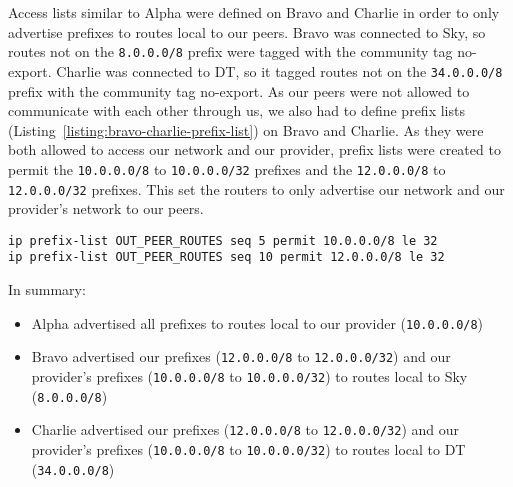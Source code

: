 Access lists similar to Alpha were defined on Bravo and Charlie in order to
only advertise prefixes to routes local to our peers. Bravo was connected to
Sky, so routes not on the \texttt{8.0.0.0/8} prefix were tagged with the
community tag no-export. Charlie was connected to DT, so it tagged routes not
on the \texttt{34.0.0.0/8} prefix with the community tag no-export. As our
peers were not allowed to communicate with each other through us, we also had
to define prefix lists (Listing~\ref{listing:bravo-charlie-prefix-list}) on Bravo and Charlie. As they were both allowed to
access our network and our provider, prefix lists were created to permit the
\texttt{10.0.0.0/8} to \texttt{10.0.0.0/32} prefixes and the
\texttt{12.0.0.0/8} to \texttt{12.0.0.0/32} prefixes. This set the routers to
only advertise our network and our provider's network to our peers.

\begin{lstlisting}[caption={Bravo and Charlie Prefix List}, label={listing:bravo-charlie-prefix-list}]
ip prefix-list OUT_PEER_ROUTES seq 5 permit 10.0.0.0/8 le 32
ip prefix-list OUT_PEER_ROUTES seq 10 permit 12.0.0.0/8 le 32
\end{lstlisting}

In summary:

\begin{itemize}
    \item Alpha advertised all prefixes to routes local to our provider
    (\texttt{10.0.0.0/8})

    \item Bravo advertised our prefixes (\texttt{12.0.0.0/8} to \texttt
    {12.0.0.0/32}) and our provider's prefixes (\texttt{10.0.0.0/8} to
    \texttt{10.0.0.0/32}) to routes local to Sky (\texttt{8.0.0.0/8})

    \item Charlie advertised our prefixes (\texttt{12.0.0.0/8} to \texttt
    {12.0.0.0/32}) and our provider's prefixes (\texttt{10.0.0.0/8} to \texttt
    {10.0.0.0/32}) to routes local to DT (\texttt{34.0.0.0/8})
\end{itemize}
